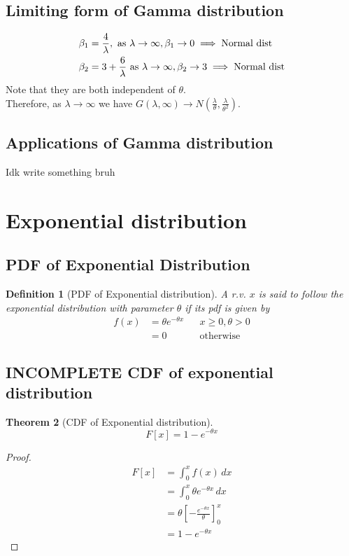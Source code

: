 \documentclass[oneside,11pt,pdftex]{book}%
\numberwithin{equation}{section}
\newtheorem{theorem}{Theorem}[chapter]%
\newtheorem{definition}[theorem]{Definition}
\numberwithin{section}{chapter}
\numberwithin{equation}{chapter}
\begin{document}
\subsection{Limiting form of Gamma distribution}
\begin{align*}
	\beta_1 &= \frac{4}{\lambda}, \text{ as $ \lambda \rightarrow \infty $}, \beta_1 \rightarrow 0 \implies \text{Normal dist}\\
	\beta_2 &= 3+ \frac{6}{\lambda } \text{ as $ \lambda \rightarrow \infty $}, \beta_2 \rightarrow 3 \implies \text{Normal dist}
\end{align*}
Note that they are both independent of $ \theta  $.\\
Therefore, as $ \lambda \rightarrow \infty  $ we have $ G(\lambda , \infty ) \rightarrow N \left(\frac{\lambda}{\theta}, \frac{\lambda }{\theta^2}\right)$.

\subsection{Applications of Gamma distribution}
Idk write something bruh

\section{Exponential distribution}
\subsection{PDF of Exponential Distribution}
\begin{definition}[PDF of Exponential distribution]
	A r.v. $ x $ is said to follow the exponential distribution with parameter $ \theta  $ if its pdf is given by 
	\begin{align*}
		f(x)&= \theta e^{-\theta x} && x\geq 0, \theta > 0\\
		&= 0 && \text{otherwise}
	\end{align*}
\end{definition}


\subsection{INCOMPLETE CDF of exponential distribution}
\begin{theorem}[CDF of Exponential distribution]
	$$F[x]=1-e^{-\theta x}$$
\end{theorem}
\begin{proof}
	\begin{align*}
		F[x]&=\int_0^x f(x)\, dx\\
		&= \int_0^x \theta e^{-\theta x}\, dx\\
		&=\theta \left[-\frac{e^{-\theta x}}{\theta}\right]_{0}^x\\
		&=1-e^{-\theta x}
	\end{align*}
\end{proof}
\end{document}

